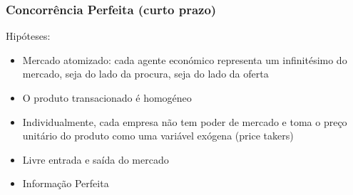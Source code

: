 \begin{frame}
	\frametitle{Concorr\^encia Perfeita (curto prazo)}
	Hip\'oteses:
	\begin{itemize}
		\item Mercado atomizado: cada agente econ\'omico representa um infinit\'esimo do mercado, seja do lado da procura, seja do lado da oferta
		\item O produto transacionado \'e homog\'eneo
		\item Individualmente, cada empresa n\~ao tem poder de mercado e toma o pre\c co unit\'ario do produto como uma vari\'avel ex\'ogena (price takers)
		\item Livre entrada e sa\'ida do mercado
		\item Informa\c c\~ao Perfeita
	\end{itemize}
\end{frame}